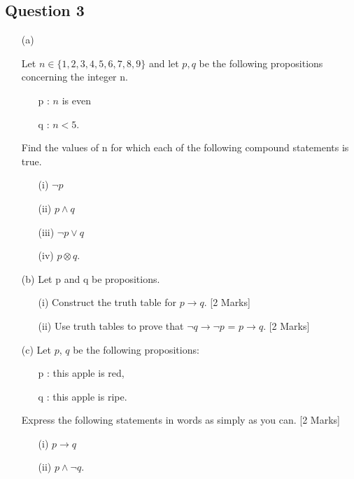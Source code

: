 \documentclass[a4paper,12pt]{article}
\begin{document}
\subsection*{Question 3}
\begin{itemize}
\item[(a)]

Let $n \in \{1,2,3,4,5,6,7, 8 ,9\}$ and let $p,q$ be the following propositions concerning the integer n.

\begin{itemize}
\item[p]: $n$ is even
\item[q]: $n < 5$.
\end{itemize}

Find the values of n for which each of the following compound statements is
true.
\begin{itemize}
\item[(i)] $\neg p$
\item[(ii)] $p \wedge q$
\item[(iii)] $\neg p \vee q$
\item[(iv)] $ p \otimes q$.
\end{itemize}

\item[(b)] Let p and q be propositions.
\begin{itemize}
\item[(i)]  Construct the truth table for $p \rightarrow q$. [2 Marks]
\item[(ii)] Use truth tables to prove that $\neg q \rightarrow \neg p$ = $p \rightarrow q$. [2 Marks]
\end{itemize}


\item[(c)] Let $p$, $q$ be the following propositions:
\begin{itemize}
\item[p] : this apple is red, 
\item[q] : this apple is ripe. 
\end{itemize}

Express the following statements in words as simply as you can. [2 Marks]
\begin{itemize}
\item[(i)] $p \rightarrow q$ \\
\item[(ii)] $p \wedge \neg q$.\\
\end{itemize}

\end{itemize}
\newpage
\end{document}
